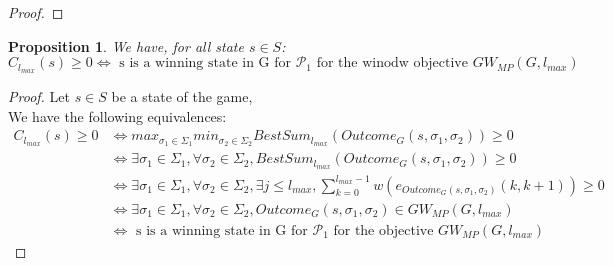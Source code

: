 \documentclass{article}
\theoremstyle{plain}
\newtheorem{prop}[thm]{Proposition}
\begin{document}
\begin{proof}
%
%
%
%
\end{proof}

\begin{prop}
We have, for all state $s \in S$:
\[C_{l_{max}}(s) \geqslant 0 \iff \text{ s is a winning state in G for $\mathcal{P}_1$ for the winodw objective } GW_{MP}(G, l_{max})\]
\end{prop}

\begin{proof}
Let $s \in S$ be a state of the game,\\
We have the following equivalences:
\begin{align}
C_{l_{max}}(s) \geqslant 0 &\iff max_{\sigma_1 \in \Sigma_1} min_{\sigma_2 \in \Sigma_2} BestSum_{l_{max}}(Outcome_G(s, \sigma_1, \sigma_2)) \geqslant 0\\
						   &\iff \exists \sigma_1 \in \Sigma_1, \forall \sigma_2 \in \Sigma_2, BestSum_{l_{max}}(Outcome_G(s, \sigma_1, \sigma_2)) \geqslant 0\\
						   &\iff \exists \sigma_1 \in \Sigma_1, \forall \sigma_2 \in \Sigma_2, \exists j \leqslant l_{max}, \sum_{k=0}^{l_{max}-1} w(e_{Outcome_G(s, \sigma_1, \sigma_2)} (k, k+1)) \geqslant 0\\
						   &\iff \exists \sigma_1 \in \Sigma_1, \forall \sigma_2 \in \Sigma_2, Outcome_G(s, \sigma_1, \sigma_2) \in GW_{MP}(G, l_{max})\\
						   &\iff \text{ s is a winning state in G for $\mathcal{P}_1$ for the objective } GW_{MP}(G, l_{max})
\end{align}

\end{proof}
\end{document}
